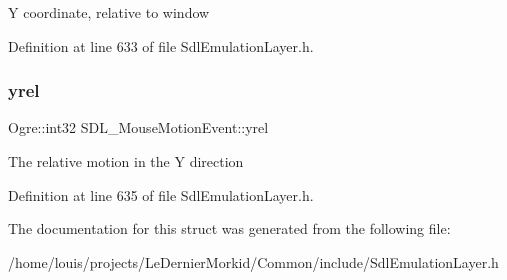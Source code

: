 Y coordinate, relative to window 

Definition at line 633 of file Sdl\+Emulation\+Layer.\+h.

\mbox{\label{struct_s_d_l___mouse_motion_event_a3e0fa5c6ad5bf75518caff81f984aed3}} 
\subsubsection{\texorpdfstring{yrel}{yrel}}
{\footnotesize\ttfamily Ogre\+::int32 S\+D\+L\+\_\+\+Mouse\+Motion\+Event\+::yrel}

The relative motion in the Y direction 

Definition at line 635 of file Sdl\+Emulation\+Layer.\+h.



The documentation for this struct was generated from the following file\+:\begin{DoxyCompactItemize}
\item 
/home/louis/projects/\+Le\+Dernier\+Morkid/\+Common/include/Sdl\+Emulation\+Layer.\+h\end{DoxyCompactItemize}
